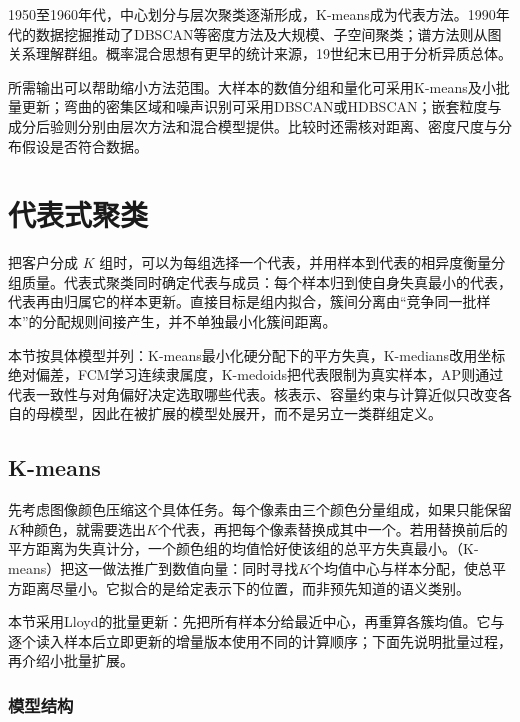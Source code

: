 1950至1960年代，中心划分与层次聚类逐渐形成，K-means成为代表方法。1990年代的数据挖掘推动了DBSCAN等密度方法及大规模、子空间聚类；谱方法则从图关系理解群组。概率混合思想有更早的统计来源，19世纪末已用于分析异质总体。

所需输出可以帮助缩小方法范围。大样本的数值分组和量化可采用K-means及小批量更新；弯曲的密集区域和噪声识别可采用DBSCAN或HDBSCAN；嵌套粒度与成分后验则分别由层次方法和混合模型提供。比较时还需核对距离、密度尺度与分布假设是否符合数据。

\section{代表式聚类}
\label{sec:clustering-partition}

把客户分成 $K$ 组时，可以为每组选择一个代表，并用样本到代表的相异度衡量分组质量。代表式聚类同时确定代表与成员：每个样本归到使自身失真最小的代表，代表再由归属它的样本更新。直接目标是组内拟合，簇间分离由“竞争同一批样本”的分配规则间接产生，并不单独最小化簇间距离。

本节按具体模型并列：K-means最小化硬分配下的平方失真，K-medians改用坐标绝对偏差，FCM学习连续隶属度，K-medoids把代表限制为真实样本，AP则通过代表一致性与对角偏好决定选取哪些代表。核表示、容量约束与计算近似只改变各自的母模型，因此在被扩展的模型处展开，而不是另立一类群组定义。

\subsection{K-means}
\label{sec:clustering-kmeans}

先考虑图像颜色压缩这个具体任务。每个像素由三个颜色分量组成，如果只能保留$K$种颜色，就需要选出$K$个代表，再把每个像素替换成其中一个。若用替换前后的平方距离为失真计分，一个颜色组的均值恰好使该组的总平方失真最小。（K-means）把这一做法推广到数值向量：同时寻找$K$个均值中心与样本分配，使总平方距离尽量小。它拟合的是给定表示下的位置，而非预先知道的语义类别。

本节采用Lloyd的批量更新：先把所有样本分给最近中心，再重算各簇均值。它与逐个读入样本后立即更新的增量版本使用不同的计算顺序；下面先说明批量过程，再介绍小批量扩展。

\subsubsection{模型结构}

